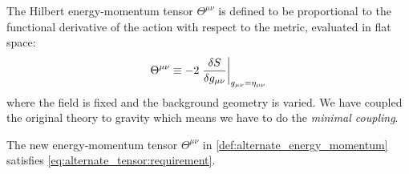 \documentclass[10pt]{article}
\begin{document}
\begin{definition}
    The Hilbert energy-momentum tensor $\Theta^{\mu\nu}$ is defined to be proportional to the functional derivative of the action with respect to the metric, evaluated in flat space:
    \begin{align}
        \Theta^{\mu\nu}\equiv-2\eval{\fdv{S}{g_{\mu\nu}}}_{g_{\mu\nu}=\eta_{\mu\nu}}\label{eq:alternate_tensor:equation}
    \end{align}
    where the field is fixed and the background geometry is varied.
    We have coupled the original theory to gravity which means we have to do the \textit{minimal coupling}\snm.
\end{definition}
\begin{claim}
    The new energy-momentum tensor $\Theta^{\mu\nu}$ in \cref{def:alternate_energy_momentum} satisfies \cref{eq:alternate_tensor:requirement}.
\end{claim}
\end{document}
